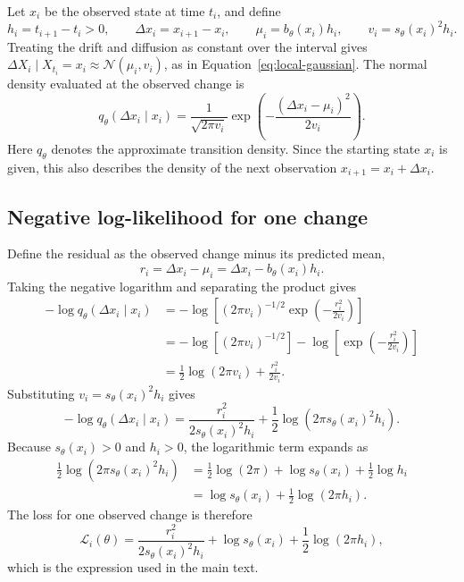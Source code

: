 Let $x_i$ be the observed state at time $t_i$, and define
\begin{equation}
    h_i=t_{i+1}-t_i>0,\qquad
    \Delta x_i=x_{i+1}-x_i,\qquad
    \mu_i=b_\theta(x_i)h_i,\qquad
    v_i=s_\theta(x_i)^2h_i.
\end{equation}
Treating the drift and diffusion as constant over the interval gives
$\Delta X_i\mid X_{t_i}=x_i\approx\mathcal{N}(\mu_i,v_i)$, as in
Equation~\eqref{eq:local-gaussian}. The normal density evaluated at the
observed change is \parencite{NISTHandbook}
\begin{equation}
    q_\theta(\Delta x_i\mid x_i)
      =\frac{1}{\sqrt{2\pi v_i}}
       \exp\!\left(-\frac{(\Delta x_i-\mu_i)^2}{2v_i}\right).
\end{equation}
Here $q_\theta$ denotes the approximate transition density. Since the starting
state $x_i$ is given, this also describes the density of the next observation
$x_{i+1}=x_i+\Delta x_i$.

\subsection{Negative log-likelihood for one change}

Define the residual as the observed change minus its predicted mean,
\begin{equation}
    r_i=\Delta x_i-\mu_i
       =\Delta x_i-b_\theta(x_i)h_i.
\end{equation}
Taking the negative logarithm and separating the product gives
\begin{align*}
    -\log q_\theta(\Delta x_i\mid x_i)
      &=-\log\!\left[(2\pi v_i)^{-1/2}
               \exp\!\left(-\frac{r_i^2}{2v_i}\right)\right]\\
      &=-\log\!\left[(2\pi v_i)^{-1/2}\right]
        -\log\!\left[\exp\!\left(-\frac{r_i^2}{2v_i}\right)\right]\\
      &=\frac12\log(2\pi v_i)+\frac{r_i^2}{2v_i}.
\end{align*}
Substituting $v_i=s_\theta(x_i)^2h_i$ gives
\begin{equation*}
    -\log q_\theta(\Delta x_i\mid x_i)
      =\frac{r_i^2}{2s_\theta(x_i)^2h_i}
       +\frac12\log\!\left(2\pi s_\theta(x_i)^2h_i\right).
\end{equation*}
Because $s_\theta(x_i)>0$ and $h_i>0$, the logarithmic term expands as
\begin{align*}
    \frac12\log\!\left(2\pi s_\theta(x_i)^2h_i\right)
       &=\frac12\log(2\pi)+\log s_\theta(x_i)+\frac12\log h_i\\
       &=\log s_\theta(x_i)+\frac12\log(2\pi h_i).
\end{align*}
The loss for one observed change is therefore
\begin{equation}
    \mathcal{L}_i(\theta)
       =\frac{r_i^2}{2s_\theta(x_i)^2h_i}
        +\log s_\theta(x_i)
        +\frac12\log(2\pi h_i),
\end{equation}
which is the expression used in the main text.

